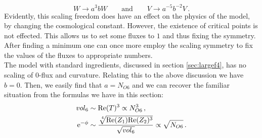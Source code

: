 \documentclass[a4paper,12pt,twoside,openright]{report}
\newcommand{\be}{\begin{equation}}
\newcommand{\ee}{\end{equation}}
\newcommand{\bea}{\begin{equation}\begin{aligned}}
\newcommand{\eea}{\end{aligned}\end{equation}}
\def\rme{{\rm e}}
\def\rmre{{\rm Re}}
\begin{document}
\be 
W \to a^ 3 b W \qquad \text{and} \qquad V \to a^ {-5}b^ {-2} V\,.
\ee
Evidently, this scaling freedom does have an effect on the physics of the model, by changing the cosmological constant. However, the existence of critical points is not effected. This allows us to set some fluxes to $1$ and thus fixing the symmetry. After finding a minimum one can once more employ the scaling symmetry to fix the values of the fluxes to appropriate numbers.\\
The model with standard ingredients, discussed in section \ref{sec:largef4}, has no scaling of $0$-flux and curvature. Relating this to the above discussion we have $b=0$. Then, we easily find that $a =N_{O6}$ and we can recover the familiar situation from the formulas we have in this section:
\bea 
vol_6 &\sim \rmre(T)^ 3 \propto N^ 3_{O6}\,,\\
\rme^ {-\phi} &\sim \frac{\sqrt[\leftroot{-2}\uproot{2} 4]{\rmre(Z_1)\rmre(Z_2)^ 3}}{\sqrt{vol_6}} \propto \sqrt{N_{O6}}\,.
\eea
\end{document}
